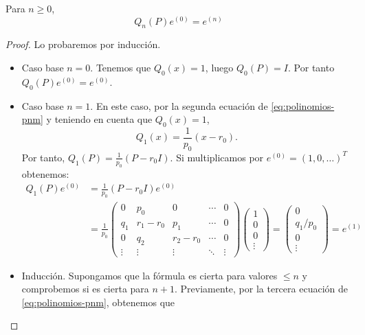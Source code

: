     \begin{proposicion}
        \label{prop:formula-e}
        Para $n\geq 0$,
        \begin{equation}
            Q_n(P)e^{(0)} = e^{(n)}
        \end{equation}
    \end{proposicion}
    \begin{proof}
        Lo probaremos por inducción.
        \begin{itemize}
            \item Caso base $n=0$. Tenemos que $Q_0(x)=1$, luego $Q_0(P)=I$. Por tanto $Q_0(P) e^{(0)} = e^{(0)}$.
            \item Caso base $n=1$. En este caso, por la segunda ecuación de \eqref{eq:polinomios-pnm} y teniendo en cuenta que $Q_0(x)=1$,
            $$
            Q_1(x) = \frac{1}{p_0}(x-r_0).
            $$
            Por tanto, $Q_1(P) = \frac{1}{p_0}(P-r_0 I)$. Si multiplicamos por $e^{(0)}=(1,0,\dots)^T$ obtenemos:
            \begin{equation*}
                \begin{split}
                    Q_1(P)e^{(0)} &=  \frac{1}{p_0}(P-r_0 I) e^{(0)} \\
                    &=  \frac{1}{p_0} \begin{pmatrix}
                        0 & p_0 & 0  & \cdots & 0 \\
                        q_1 & r_1-r_0 & p_1 & \cdots & 0 \\
                        0 & q_2 & r_2-r_0 & \cdots & 0 \\
                        \vdots & \vdots & \vdots &\ddots & \vdots
                    \end{pmatrix} \begin{pmatrix}
                        1 \\ 0 \\ 0 \\ \vdots 
                    \end{pmatrix} = \begin{pmatrix}
                        0 \\ q_1/p_0 \\ 0 \\ \vdots
                    \end{pmatrix}= e^{(1)}
                \end{split}
            \end{equation*}
            \item Inducción. Supongamos que la fórmula es cierta para valores $\leq n$ y comprobemos si es cierta para $n+1$. Previamente, por la tercera ecuación de \eqref{eq:polinomios-pnm}, obtenemos que 

\end{itemize}
\end{proof}

